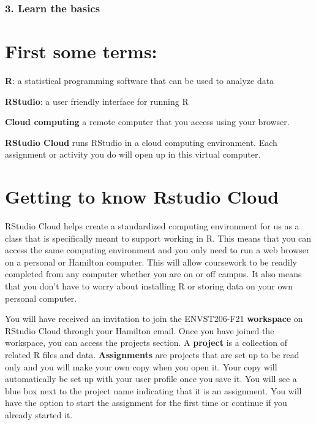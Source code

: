 \documentclass[
]{book}
\theoremstyle{definition}
\theoremstyle{definition}
\theoremstyle{definition}
\theoremstyle{definition}
\theoremstyle{remark}
\begin{document}
\hypertarget{learn-the-basics}{%
\subsubsection{3. Learn the basics}\label{learn-the-basics}}

\hypertarget{first-some-terms}{%
\section{First some terms:}\label{first-some-terms}}

\textbf{R}: a statistical programming software that can be used to analyze data

\textbf{RStudio}: a user friendly interface for running R

\textbf{Cloud computing} a remote computer that you access using your browser.

\textbf{RStudio Cloud} runs RStudio in a cloud computing environment. Each assignment or activity you do will open up in this virtual computer.

\hypertarget{getting-to-know-rstudio-cloud}{%
\section{Getting to know Rstudio Cloud}\label{getting-to-know-rstudio-cloud}}

RStudio Cloud helps create a standardized computing environment for us as a class that is specifically meant to support working in R. This means that you can access the same computing environment and you only need to run a web browser on a personal or Hamilton computer. This will allow coursework to be readily completed from any computer whether you are on or off campus. It also means that you don't have to worry about installing R or storing data on your own personal computer.

You will have received an invitation to join the ENVST206-F21 \textbf{workspace} on RStudio Cloud through your Hamilton email. Once you have joined the workspace, you can access the projects section. A \textbf{project} is a collection of related R files and data. \textbf{Assignments} are projects that are set up to be read only and you will make your own copy when you open it. Your copy will automatically be set up with your user profile once you save it. You will see a blue box next to the project name indicating that it is an assignment. You will have the option to start the assignment for the first time or continue if you already started it.
\end{document}
